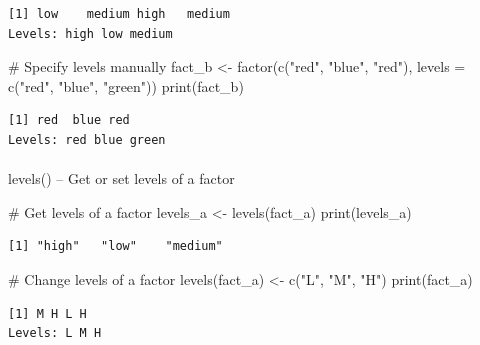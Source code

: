 \documentclass[
  letterpaper,
  DIV=11,
  numbers=noendperiod]{scrartcl}
\makeatletter
\let\oldparagraph\paragraph
\renewcommand{\paragraph}{
    \@ifstar
      \xxxParagraphStar
      \xxxParagraphNoStar
  }
\newcommand{\xxxParagraphStar}[1]{\oldparagraph*{#1}\mbox{}}
\newcommand{\xxxParagraphNoStar}[1]{\oldparagraph{#1}\mbox{}}
\newenvironment{Shaded}{\begin{snugshade}}{\end{snugshade}}
\newcommand{\AttributeTok}[1]{\textcolor[rgb]{0.40,0.45,0.13}{#1}}
\newcommand{\CommentTok}[1]{\textcolor[rgb]{0.37,0.37,0.37}{#1}}
\newcommand{\FunctionTok}[1]{\textcolor[rgb]{0.28,0.35,0.67}{#1}}
\newcommand{\NormalTok}[1]{\textcolor[rgb]{0.00,0.23,0.31}{#1}}
\newcommand{\OtherTok}[1]{\textcolor[rgb]{0.00,0.23,0.31}{#1}}
\newcommand{\StringTok}[1]{\textcolor[rgb]{0.13,0.47,0.30}{#1}}
\makeatother
\begin{document}
\begin{verbatim}
[1] low    medium high   medium
Levels: high low medium
\end{verbatim}

\begin{Shaded}
\begin{Highlighting}[]
\CommentTok{\#   Specify levels manually}
\NormalTok{fact\_b }\OtherTok{\textless{}{-}} \FunctionTok{factor}\NormalTok{(}\FunctionTok{c}\NormalTok{(}\StringTok{"red"}\NormalTok{, }\StringTok{"blue"}\NormalTok{, }\StringTok{"red"}\NormalTok{), }\AttributeTok{levels =} \FunctionTok{c}\NormalTok{(}\StringTok{"red"}\NormalTok{, }\StringTok{"blue"}\NormalTok{, }\StringTok{"green"}\NormalTok{))}
\FunctionTok{print}\NormalTok{(fact\_b)}
\end{Highlighting}
\end{Shaded}

\begin{verbatim}
[1] red  blue red 
Levels: red blue green
\end{verbatim}

\paragraph{levels() -- Get or set levels of a
factor}\label{levels-get-or-set-levels-of-a-factor}

\begin{Shaded}
\begin{Highlighting}[]
\CommentTok{\#   Get levels of a factor}
\NormalTok{levels\_a }\OtherTok{\textless{}{-}} \FunctionTok{levels}\NormalTok{(fact\_a)}
\FunctionTok{print}\NormalTok{(levels\_a)}
\end{Highlighting}
\end{Shaded}

\begin{verbatim}
[1] "high"   "low"    "medium"
\end{verbatim}

\begin{Shaded}
\begin{Highlighting}[]
\CommentTok{\#   Change levels of a factor}
\FunctionTok{levels}\NormalTok{(fact\_a) }\OtherTok{\textless{}{-}} \FunctionTok{c}\NormalTok{(}\StringTok{"L"}\NormalTok{, }\StringTok{"M"}\NormalTok{, }\StringTok{"H"}\NormalTok{)}
\FunctionTok{print}\NormalTok{(fact\_a)}
\end{Highlighting}
\end{Shaded}

\begin{verbatim}
[1] M H L H
Levels: L M H
\end{verbatim}
\end{document}
